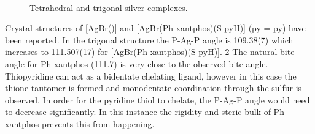 \begin{figure}[htbp]
\begin{subfigure}[b]{0.3\textwidth}
	\caption{}
	\label{AgxantphosBr}
\end{subfigure}
\\
\caption[Silver \Phxantphos{} complexes]{Tetrahedral and trigonal silver \Phxantphos{} complexes.}
\label{AgPhxantphos}
\end{figure}



Crystal structures of [AgBr(\Phxantphos)] and [AgBr(Ph-xantphos)(S-pyH)] (\acrshort{py} = \acrlong{py}) have been reported.\cite{Kaltzoglou2007}  In the trigonal structure the P-Ag-P angle is 109.38(7)\degrees{} which increases to 111.507(17)\degrees{} for [AgBr(Ph-xantphos)(S-pyH)].  2-The natural bite-angle for Ph-xantphos (111.7\degrees)\cite{Birkholz2009} is very close to the observed bite-angle.  Thiopyridine can act as a bidentate chelating ligand, however in this case the thione tautomer is formed and monodentate coordination through the sulfur is observed.  In order for the pyridine thiol to chelate, the P-Ag-P angle would need to decrease significantly.  In this instance the rigidity and steric bulk of Ph-xantphos prevents this from happening.\cite{Kaltzoglou2007}

